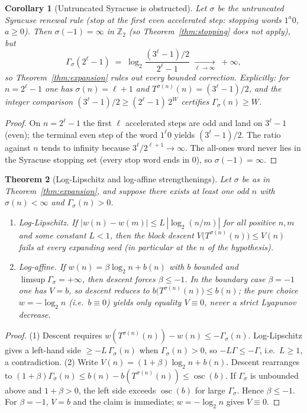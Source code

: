 \documentclass[11pt]{amsart}
\newtheorem{theorem}{Theorem}[section]
\newtheorem{corollary}[theorem]{Corollary}
\theoremstyle{definition}
\theoremstyle{remark}
\newcommand{\Z}{\mathbb{Z}}
\newcommand{\Ztwo}{\Z_2}
\begin{document}
\begin{corollary}[Untruncated Syracuse is obstructed]\label{cor:syracuse}
Let $\sigma$ be the untruncated Syracuse renewal rule (stop at the first even accelerated step: stopping words $1^a 0$, $a \ge 0$). Then $\sigma(-1) = \infty$ in $\Ztwo$ (so Theorem~\ref{thm:stopping} does not apply), but
\[
\Gamma_\sigma(2^\ell - 1) \;=\; \log_2 \frac{(3^\ell - 1)/2}{2^\ell - 1} \;\xrightarrow[\ell\to\infty]{}\; +\infty ,
\]
so Theorem~\ref{thm:expansion} rules out every bounded correction. Explicitly: for $n = 2^\ell - 1$ one has $\sigma(n) = \ell + 1$ and $T^{\sigma(n)}(n) = (3^\ell - 1)/2$, and the integer comparison $(3^\ell - 1)/2 \ge (2^\ell - 1)\, 2^W$ certifies $\Gamma_\sigma(n) \ge W$.
\end{corollary}

\begin{proof}
On $n = 2^\ell - 1$ the first $\ell$ accelerated steps are odd and land on $3^\ell - 1$ (even); the terminal even step of the word $1^\ell 0$ yields $(3^\ell - 1)/2$. The ratio against $n$ tends to infinity because $3^\ell / 2^{\ell+1} \to \infty$. The all-ones word never lies in the Syracuse stopping set (every stop word ends in $0$), so $\sigma(-1) = \infty$.
\end{proof}

\begin{theorem}[Log-Lipschitz and log-affine strengthenings]\label{thm:logclass}
Let $\sigma$ be as in Theorem~\ref{thm:expansion}, and suppose there exists at least one odd $n$ with $\sigma(n) < \infty$ and $\Gamma_\sigma(n) > 0$.
\begin{enumerate}
\item \emph{Log-Lipschitz.} If $|w(n) - w(m)| \le L\,|\log_2(n/m)|$ for all positive $n,m$ and some constant $L < 1$, then the block descent $V\bigl(T^{\sigma(n)}(n)\bigr) \le V(n)$ fails at every expanding seed (in particular at the $n$ of the hypothesis).
\item \emph{Log-affine.} If $w(n) = \beta \log_2 n + b(n)$ with $b$ bounded and $\limsup \Gamma_\sigma = +\infty$, then descent forces $\beta \le -1$. In the boundary case $\beta = -1$ one has $V = b$, so descent reduces to $b\bigl(T^{\sigma(n)}(n)\bigr) \le b(n)$; the pure choice $w = -\log_2 n$ (i.e.\ $b \equiv 0$) yields only equality $V \equiv 0$, never a strict Lyapunov decrease.
\end{enumerate}
\end{theorem}

\begin{proof}
(1) Descent requires $w(T^{\sigma(n)}(n)) - w(n) \le -\Gamma_\sigma(n)$. Log-Lipschitz gives a left-hand side $\ge -L\,\Gamma_\sigma(n)$ when $\Gamma_\sigma(n) > 0$, so $-L\Gamma \le -\Gamma$, i.e.\ $L \ge 1$, a contradiction.
(2) Write $V(n) = (1+\beta)\log_2 n + b(n)$. Descent rearranges to $(1+\beta)\Gamma_\sigma(n) \le b(n) - b(T^{\sigma(n)}(n)) \le \operatorname{osc}(b)$. If $\Gamma_\sigma$ is unbounded above and $1+\beta > 0$, the left side exceeds $\operatorname{osc}(b)$ for large $\Gamma_\sigma$. Hence $\beta \le -1$. For $\beta = -1$, $V = b$ and the claim is immediate; $w = -\log_2 n$ gives $V \equiv 0$.
\end{proof}
\end{document}
